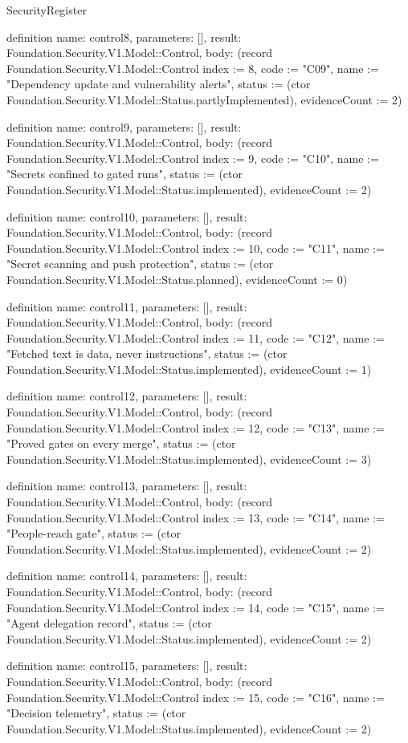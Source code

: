 \begin{lexlean}{SecurityRegister}
\begin{semanticmodule}
definition{
  name: control8,
  parameters: [],
  result: Foundation.Security.V1.Model::Control,
  body: (record Foundation.Security.V1.Model::Control {index := 8, code := "C09", name := "Dependency update and vulnerability alerts", status := (ctor Foundation.Security.V1.Model::Status.partlyImplemented), evidenceCount := 2})
}

definition{
  name: control9,
  parameters: [],
  result: Foundation.Security.V1.Model::Control,
  body: (record Foundation.Security.V1.Model::Control {index := 9, code := "C10", name := "Secrets confined to gated runs", status := (ctor Foundation.Security.V1.Model::Status.implemented), evidenceCount := 2})
}

definition{
  name: control10,
  parameters: [],
  result: Foundation.Security.V1.Model::Control,
  body: (record Foundation.Security.V1.Model::Control {index := 10, code := "C11", name := "Secret scanning and push protection", status := (ctor Foundation.Security.V1.Model::Status.planned), evidenceCount := 0})
}

definition{
  name: control11,
  parameters: [],
  result: Foundation.Security.V1.Model::Control,
  body: (record Foundation.Security.V1.Model::Control {index := 11, code := "C12", name := "Fetched text is data, never instructions", status := (ctor Foundation.Security.V1.Model::Status.implemented), evidenceCount := 1})
}

definition{
  name: control12,
  parameters: [],
  result: Foundation.Security.V1.Model::Control,
  body: (record Foundation.Security.V1.Model::Control {index := 12, code := "C13", name := "Proved gates on every merge", status := (ctor Foundation.Security.V1.Model::Status.implemented), evidenceCount := 3})
}

definition{
  name: control13,
  parameters: [],
  result: Foundation.Security.V1.Model::Control,
  body: (record Foundation.Security.V1.Model::Control {index := 13, code := "C14", name := "People-reach gate", status := (ctor Foundation.Security.V1.Model::Status.implemented), evidenceCount := 2})
}

definition{
  name: control14,
  parameters: [],
  result: Foundation.Security.V1.Model::Control,
  body: (record Foundation.Security.V1.Model::Control {index := 14, code := "C15", name := "Agent delegation record", status := (ctor Foundation.Security.V1.Model::Status.implemented), evidenceCount := 2})
}

definition{
  name: control15,
  parameters: [],
  result: Foundation.Security.V1.Model::Control,
  body: (record Foundation.Security.V1.Model::Control {index := 15, code := "C16", name := "Decision telemetry", status := (ctor Foundation.Security.V1.Model::Status.implemented), evidenceCount := 2})
}


\end{semanticmodule}
\end{lexlean}
